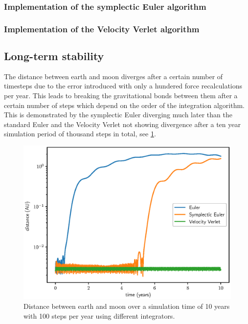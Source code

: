 \documentclass[a4paper,10pt,bibtotoc]{scrartcl}
\begin{document}
\subsubsection{Implementation of the symplectic Euler algorithm}

\subsubsection{Implementation of the Velocity Verlet algorithm}


\subsection{Long-term stability}
The distance between earth and moon diverges after a certain number of timesteps due to the error introduced with only a hundered force recalculations per year.
This leads to breaking the gravitational bonds between them after a certain number of steps which depend on the order of the integration algorithm.
This is demonstrated by the symplectic Euler diverging much later than the standard Euler and the Velocity Verlet not showing divergence
after a ten year simulation period of thousand steps in total, see \ref{fig:stability_distance}.

\begin{figure}[h]
\centering
 \includegraphics[width=\textwidth]{stability_distance.eps}
 \caption{Distance between earth and moon over a simulation time of 10 years with 100 steps per year using different integrators.}
 \label{fig:stability_distance}
\end{figure}
\end{document}
